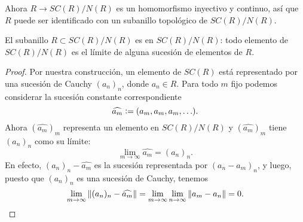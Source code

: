 \documentclass{article}
\numberwithin{equation}{section}
\theoremstyle{definition}
\begin{document}
Ahora $R\to SC(R)/N(R)$ es un homomorfismo inyectivo y continuo, así que $R$
puede ser identificado con un subanillo topológico de $SC(R)/N(R)$.

\begin{lema}
  El subanillo $R \subset SC (R) / N (R)$ es  en $SC (R) / N (R)$:
  todo elemento de $SC (R) / N (R)$ es el límite de alguna sucesión de elementos
  de $R$.

  \begin{proof}
    Por nuestra construcción, un elemento de $SC (R)$ está representado por
    una sucesión de Cauchy $(a_n)_n$, donde $a_n\in R$. Para todo $m$ fijo
    podemos considerar la sucesión constante correspondiente
    $$\widehat{a_m} \mathrel{\mathop:}= (a_m,a_m,a_m,\ldots).$$
    Ahora $(\widehat{a_m})_m$ representa un elemento en $SC (R)/N (R)$ y
    $(\widehat{a_m})_m$ tiene $(a_n)_n$ como su límite:
    $$\lim_{m\to\infty} \widehat{a_m} = (a_n)_n.$$
    En efecto, $(a_n)_n - \widehat{a_m}$ es la sucesión representada por
    $(a_n - a_m)_n$, y luego, puesto que $(a_n)_n$ es una sucesión de Cauchy,
    tenemos
    \[ \lim_{m\to\infty} \|(a_n)_n - \widehat{a_m}\| =
       \lim_{m\to\infty} \lim_{n\to\infty} \|a_m - a_n\| = 0. \qedhere \]
  \end{proof}
\end{lema}
\end{document}
